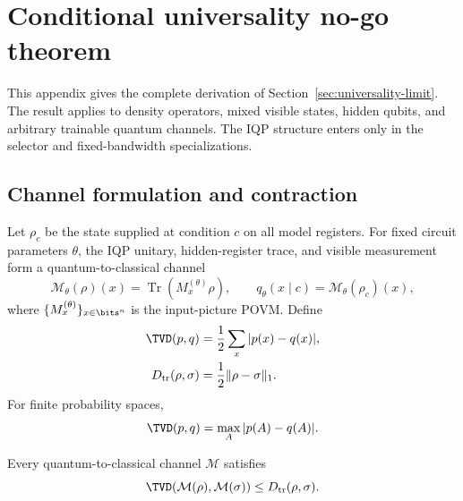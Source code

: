\section{Conditional universality no-go theorem}
\label{app:conditional-universality}

This appendix gives the complete derivation of
Section~\ref{sec:universality-limit}. The result applies to density operators,
mixed visible states, hidden qubits, and arbitrary trainable quantum channels.
The IQP structure enters only in the selector and fixed-bandwidth
specializations.

\subsection{Channel formulation and contraction}

Let $\rho_c$ be the state supplied at condition $c$ on all model registers.
For fixed circuit parameters $\theta$, the IQP unitary, hidden-register trace,
and visible measurement form a quantum-to-classical channel
\begin{equation}
 \mathcal M_\theta(\rho)(x)
 =\operatorname{Tr}\!\left(M_x^{(\theta)}\rho\right),
 \qquad
 q_\theta(x\mid c)=\mathcal M_\theta(\rho_c)(x),
 \label{eq:app-povm-channel}
\end{equation}
where $\{M_x^{(\theta)}\}_{x\in\bits^n}$ is the input-picture POVM. Define
\begin{align}
 \TVD(p,q)&=\frac12\sum_x|p(x)-q(x)|,
 \label{eq:app-tvd-definition}\\
 D_{\rm tr}(\rho,\sigma)&=\frac12\lVert\rho-\sigma\rVert_1.
 \label{eq:app-trace-definition}
\end{align}
For finite probability spaces,
\begin{equation}
 \TVD(p,q)=\max_A|p(A)-q(A)|.
 \label{eq:app-tvd-event}
\end{equation}

\begin{lemma}
\label{lem:app-contraction}
Every quantum-to-classical channel $\mathcal M$ satisfies
\begin{equation}
 \TVD\!\left(\mathcal M(\rho),\mathcal M(\sigma)\right)
 \leq D_{\rm tr}(\rho,\sigma).
 \label{eq:app-contraction}
\end{equation}
\end{lemma}

